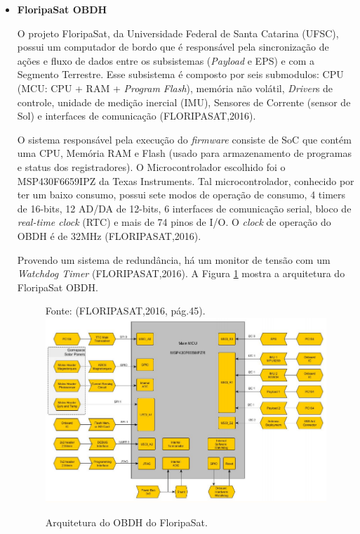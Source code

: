 \begin{itemize}
	
	\item \textbf{FloripaSat OBDH}
	
	O projeto FloripaSat, da Universidade Federal de Santa Catarina (UFSC), possui um  computador de bordo que é responsável pela sincronização de ações e fluxo de dados entre os subsistemas (\textit{Payload} e EPS) e com a Segmento Terrestre. Esse subsistema é composto por seis submodulos: CPU (MCU: CPU + RAM + \textit{Program Flash}), memória não volátil, \textit{Driver}s de controle, unidade de medição inercial (IMU), Sensores de Corrente (sensor de Sol) e interfaces de comunicação (FLORIPASAT,2016).
	
	O sistema responsável pela execução do \textit{firmware} consiste de SoC que contém uma CPU, Memória RAM e Flash (usado para armazenamento de programas e status dos registradores). O Microcontrolador escolhido foi o MSP430F6659IPZ da Texas Instruments. Tal microcontrolador, conhecido por ter um baixo consumo, possui sete modos de operação de consumo, 4 timers de 16-bits, 12 AD/DA de 12-bits, 6 interfaces de comunicação serial, bloco de \textit{real-time clock} (RTC) e mais de 74 pinos de I/O. O \textit{clock} de operação do OBDH é de 32MHz (FLORIPASAT,2016).
	
	Provendo um sistema de redundância, há um monitor de tensão com um \textit{Watchdog Timer} (FLORIPASAT,2016). A Figura \ref{fig12} mostra a arquitetura do FloripaSat OBDH.
	
	\begin{figure}[h]
		\centering
		Fonte: (FLORIPASAT,2016, pág.45).\linebreak
		\includegraphics[keepaspectratio=true,scale=0.5]{figuras/floripasatobdh.PNG}
		\caption{Arquitetura do OBDH do FloripaSat.}
		\label{fig12}
	\end{figure}
	\FloatBarrier
	

\end{itemize}
